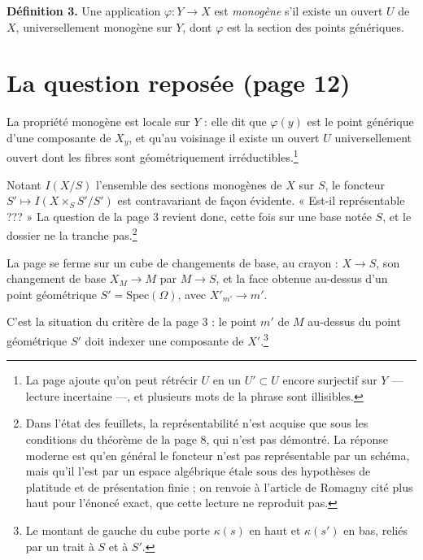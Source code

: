\documentclass[11pt,a4paper]{article}
\begin{document}
\textbf{Définition 3.} Une application $\varphi : Y \to X$ est \emph{monogène}
s'il existe un ouvert $U$ de $X$, universellement monogène sur $Y$, dont
$\varphi$ est la section des points génériques.

\section*{La question reposée (page 12)}

La propriété monogène est locale sur $Y$ : elle dit que $\varphi(y)$ est le
point générique d'une composante de $X_y$, et qu'au voisinage il existe un
ouvert $U$ universellement ouvert dont les fibres sont géométriquement
irréductibles.\footnote{La page ajoute qu'on peut rétrécir $U$ en un
$U' \subset U$ encore surjectif sur $Y$ --- lecture incertaine ---, et plusieurs
mots de la phrase sont illisibles.}

Notant $I(X/S)$ l'ensemble des sections monogènes de $X$ sur $S$, le foncteur
$S' \mapsto I(X \times_S S' / S')$ est contravariant de façon évidente. « Est-il
représentable ??? » La question de la page 3 revient donc, cette fois sur une
base notée $S$, et le dossier ne la tranche pas.\footnote{Dans l'état des
feuillets, la représentabilité n'est acquise que sous les conditions du
théorème de la page 8, qui n'est pas démontré. La réponse moderne est qu'en
général le foncteur n'est pas représentable par un schéma, mais qu'il l'est
par un espace algébrique étale sous des hypothèses de platitude et de
présentation finie ; on renvoie à l'article de Romagny cité plus haut pour
l'énoncé exact, que cette lecture ne reproduit pas.}

La page se ferme sur un cube de changements de base, au crayon : $X \to S$,
son changement de base $X_M \to M$ par $M \to S$, et la face obtenue au-dessus
d'un point géométrique $S' = \mathrm{Spec}(\Omega)$, avec $X'_{m'} \to m'$.


C'est la situation du critère de la page 3 : le point $m'$ de $M$ au-dessus du
point géométrique $S'$ doit indexer une composante de $X'$.\footnote{Le montant
de gauche du cube porte $\kappa(s)$ en haut et $\kappa(s')$ en bas, reliés par
un trait à $S$ et à $S'$.}
\end{document}
